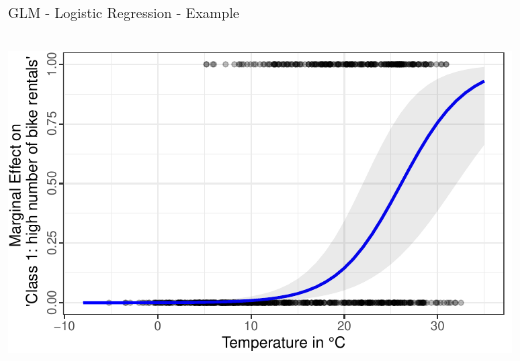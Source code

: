 \documentclass[11pt,compress,t,notes=noshow, aspectratio=169, xcolor=table]{beamer}
\begin{document}
\begin{frame}{GLM - Logistic Regression - Example}
\begin{columns}[T]
\begin{column}{0.5\textwidth}
\includegraphics[width = \textwidth]{figure/logistic_marginal_temp.pdf}
\end{column}
\end{columns}

\end{frame}


\endlecture
\end{document}
